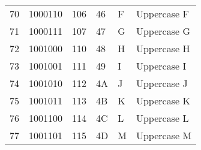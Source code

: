 \begin{center}
\begin{longtable}{llllll}
\rowcolor[HTML]{F3F6F6} 
{\color[HTML]{404040} 70}               & {\color[HTML]{404040} 1000110}         & {\color[HTML]{404040} 106}            & {\color[HTML]{404040} 46}                   & {\color[HTML]{404040} F}                  & {\color[HTML]{404040} Uppercase F}                           \\
\rowcolor[HTML]{FCFCFC} 
{\color[HTML]{404040} 71}               & {\color[HTML]{404040} 1000111}         & {\color[HTML]{404040} 107}            & {\color[HTML]{404040} 47}                   & {\color[HTML]{404040} G}                  & {\color[HTML]{404040} Uppercase G}                           \\
\rowcolor[HTML]{F3F6F6} 
{\color[HTML]{404040} 72}               & {\color[HTML]{404040} 1001000}         & {\color[HTML]{404040} 110}            & {\color[HTML]{404040} 48}                   & {\color[HTML]{404040} H}                  & {\color[HTML]{404040} Uppercase H}                           \\
\rowcolor[HTML]{FCFCFC} 
{\color[HTML]{404040} 73}               & {\color[HTML]{404040} 1001001}         & {\color[HTML]{404040} 111}            & {\color[HTML]{404040} 49}                   & {\color[HTML]{404040} I}                  & {\color[HTML]{404040} Uppercase I}                           \\
\rowcolor[HTML]{F3F6F6} 
{\color[HTML]{404040} 74}               & {\color[HTML]{404040} 1001010}         & {\color[HTML]{404040} 112}            & {\color[HTML]{404040} 4A}                   & {\color[HTML]{404040} J}                  & {\color[HTML]{404040} Uppercase J}                           \\
\rowcolor[HTML]{FCFCFC} 
{\color[HTML]{404040} 75}               & {\color[HTML]{404040} 1001011}         & {\color[HTML]{404040} 113}            & {\color[HTML]{404040} 4B}                   & {\color[HTML]{404040} K}                  & {\color[HTML]{404040} Uppercase K}                           \\
\rowcolor[HTML]{F3F6F6} 
{\color[HTML]{404040} 76}               & {\color[HTML]{404040} 1001100}         & {\color[HTML]{404040} 114}            & {\color[HTML]{404040} 4C}                   & {\color[HTML]{404040} L}                  & {\color[HTML]{404040} Uppercase L}                           \\
\rowcolor[HTML]{FCFCFC} 
{\color[HTML]{404040} 77}               & {\color[HTML]{404040} 1001101}         & {\color[HTML]{404040} 115}            & {\color[HTML]{404040} 4D}                   & {\color[HTML]{404040} M}                  & {\color[HTML]{404040} Uppercase M}                           \\

\end{longtable}
\end{center}

